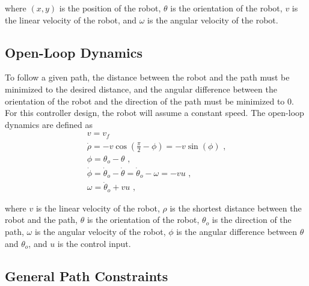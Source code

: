 \documentclass[11pt, letterpaper]{article}
\numberwithin{equation}{section}
\begin{document}
where $(x, y)$ is the position of the robot, $\theta$ is the orientation of the robot, $v$ is the linear velocity of the robot, and $\omega$ is the angular velocity of the robot.

\pagebreak

\subsection{Open-Loop Dynamics}

To follow a given path, the distance between the robot and the path must be minimized to the desired distance, and the angular difference between the orientation of the robot and the direction of the path must be minimized to $0$. For this controller design, the robot will assume a constant speed. The open-loop dynamics are defined as
\begin{gather}
    v = v_f \\
    \dot{\rho} = - v \cos(\frac{\pi}{2} - \phi) = -v \sin(\phi) \text{ ,} \\
    \phi = \theta_o - \theta \text{ ,} \\
    \dot{\phi} = \dot{\theta}_o - \dot{\theta} = \dot{\theta}_o - \omega = -v u \text{ ,} \\
    \omega = \dot{\theta}_o + v u \text{ ,}
\end{gather}

where $v$ is the linear velocity of the robot, $\rho$ is the shortest distance between the robot and the path, $\theta$ is the orientation of the robot, $\theta_o$ is the direction of the path, $\omega$ is the angular velocity of the robot, $\phi$ is the angular difference between $\theta$ and $\theta_o$, and $u$ is the control input.

\subsection{General Path Constraints}
\end{document}
